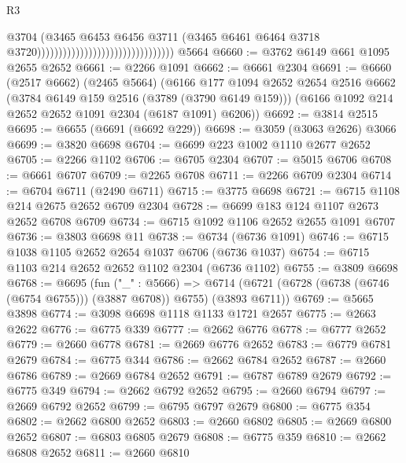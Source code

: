 \begin{lexlean}{R3}
\begin{coremodule}
                                                                @3704
                                                                (@3465
                                                                  @6453
                                                                  @6456
                                                                  @3711
                                                                  (@3465
                                                                    @6461
                                                                    @6464
                                                                    @3718
                                                                    @3720))))))))))))))))))))))))))))))))
    @5664
@6660 := @3762 @6149 @661 @1095 @2655 @2652
@6661 := @2266 @1091
@6662 := @6661 @2304
@6691 := @6660
    (@2517 @6662)
    (@2465 @5664)
    (@6166
      @177
      @1094
      @2652
      @2654
      @2516
      @6662
      (@3784 @6149 @159 @2516 (@3789 (@3790 @6149 @159)))
      (@6166 @1092 @214 @2652 @2652 @1091 @2304 (@6187 @1091) @6206))
@6692 := @3814 @2515
@6695 := @6655 (@6691 (@6692 @229))
@6698 := @3059 (@3063 @2626) @3066
@6699 := @3820 @6698
@6704 := @6699 @223 @1002 @1110 @2677 @2652
@6705 := @2266 @1102
@6706 := @6705 @2304
@6707 := @5015 @6706
@6708 := @6661 @6707
@6709 := @2265 @6708
@6711 := @2266 @6709 @2304
@6714 := @6704 @6711 (@2490 @6711)
@6715 := @3775 @6698
@6721 := @6715 @1108 @214 @2675 @2652 @6709 @2304
@6728 := @6699 @183 @124 @1107 @2673 @2652 @6708 @6709
@6734 := @6715 @1092 @1106 @2652 @2655 @1091 @6707
@6736 := @3803 @6698 @11
@6738 := @6734 (@6736 @1091)
@6746 := @6715 @1038 @1105 @2652 @2654 @1037 @6706 (@6736 @1037)
@6754 := @6715 @1103 @214 @2652 @2652 @1102 @2304 (@6736 @1102)
@6755 := @3809 @6698
@6768 := @6695
    (fun ("_" : @5666) =>
    @6714 (@6721 (@6728 (@6738 (@6746 (@6754 @6755))) (@3887 @6708)) @6755) (@3893 @6711))
@6769 := @5665 @3898
@6774 := @3098 @6698 @1118 @1133 @1721 @2657
@6775 := @2663 @2622
@6776 := @6775 @339
@6777 := @2662 @6776
@6778 := @6777 @2652
@6779 := @2660 @6778
@6781 := @2669 @6776 @2652
@6783 := @6779 @6781 @2679
@6784 := @6775 @344
@6786 := @2662 @6784 @2652
@6787 := @2660 @6786
@6789 := @2669 @6784 @2652
@6791 := @6787 @6789 @2679
@6792 := @6775 @349
@6794 := @2662 @6792 @2652
@6795 := @2660 @6794
@6797 := @2669 @6792 @2652
@6799 := @6795 @6797 @2679
@6800 := @6775 @354
@6802 := @2662 @6800 @2652
@6803 := @2660 @6802
@6805 := @2669 @6800 @2652
@6807 := @6803 @6805 @2679
@6808 := @6775 @359
@6810 := @2662 @6808 @2652
@6811 := @2660 @6810

\end{coremodule}
\end{lexlean}

